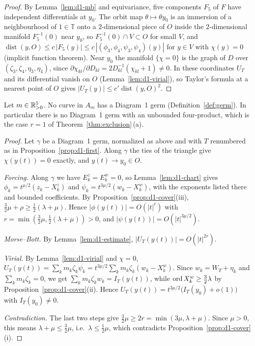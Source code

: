 \begin{proof}
By Lemma~\ref{lem:d1-mb} and equivariance, five components $F_5$ of $F$ have independent
differentials at $y_0$.  The orbit map $\theta\mapsto\theta y_0$ is an immersion of a
neighbourhood of $1\in\mathbb T$ onto a $2$-dimensional piece of $O$ inside the $2$-dimensional
manifold $F_5^{-1}(0)$ near $y_0$, so $F_5^{-1}(0)\cap V\subset O$ for small $V$, and
$\operatorname{dist}(y,O)\le c\,|F_5(y)|\le c\,|(\phi_3,\phi_4,\psi_3,\psi_4)(y)|$ for $y\in V$
with $\chi(y)=0$ (implicit function theorem).  Near $y_0$ the manifold $\{\chi=0\}$ is the graph
of $D$ over $(\zeta_3,\zeta_4,\eta_3,\eta_4)$, since $\partial\chi_{kl}/\partial D_{kl}=
2D_{kl}^{-1}(\chi_{kl}+1)\ne0$.  In these coordinates $U_T$ and its differential vanish on $O$
(Lemma~\ref{lem:d1-virial}), so Taylor's formula at a nearest point of $O$ gives $|U_T(y)|\le
c'\operatorname{dist}(y,O)^2$.
\end{proof}

\begin{theorem}\label{thm:d1}
Let $m\in\mathbb{R}_{>0}^5$.  No curve in $A_m$ has a Diagram~1 germ (Definition~\ref{def:germ}).  In
particular there is no Diagram~1 germ with an unbounded four-product, which is the case $r=1$ of
Theorem~\ref{thm:exclusion}\,(a).
\end{theorem}

\begin{proof}
Let $\gamma$ be a Diagram~1 germ, normalized as above and with $T$ renumbered as in
Proposition~\ref{prop:d1-first}.  Along $\gamma$ the ties of the triangle give $\chi(y(t))=0$
exactly, and $y(t)\to y_0\in O$.

\emph{Forcing.}  Along $\gamma$ we have $E^z_k=E^w_k=0$, so Lemma~\ref{lem:d1-chart} gives
$\phi_k=t^{\mu/2}(z_k-X^z_k)$ and $\psi_k=t^{3\mu/2}(w_k-X^w_k)$, with the exponents listed
there and bounded coefficients.  By Proposition~\ref{prop:d1-cover}(iii),
$\frac32\mu+\rho\ge\frac12(\lambda+\mu)$.  Hence $|\phi(y(t))|=O(|t|^r)$ with
$r=\min(\frac32\mu,\frac12(\lambda+\mu))>0$, and $|\psi(y(t))|=O(|t|^{3\mu/2})$.

\emph{Morse--Bott.}  By Lemma~\ref{lem:d1-estimate}, $|U_T(y(t))|=O(|t|^{2r})$.

\emph{Virial.}  By Lemma~\ref{lem:d1-virial} and $\chi=0$,
$U_T(y(t))=\sum_km_k\zeta_k\psi_k=t^{3\mu/2}\sum_km_k\zeta_k(w_k-X^w_k)$.  Since
$w_k=W_T+\eta_k$ and $\sum_km_k\zeta_k=0$, we get $\sum_km_k\zeta_kw_k=I_T(y(t))$, while
$\operatorname{ord} X^w_k\ge\frac32\lambda$ by Proposition~\ref{prop:d1-cover}(ii).  Hence
$U_T(y(t))=t^{3\mu/2}\big(I_T(y_0)+o(1)\big)$ with $I_T(y_0)\ne0$.

\emph{Contradiction.}  The last two steps give $\frac32\mu\ge2r=\min(3\mu,\lambda+\mu)$.  Since
$\mu>0$, this means $\lambda+\mu\le\frac32\mu$, i.e.\ $\lambda\le\frac12\mu$, which contradicts
Proposition~\ref{prop:d1-cover}(i).
\end{proof}

